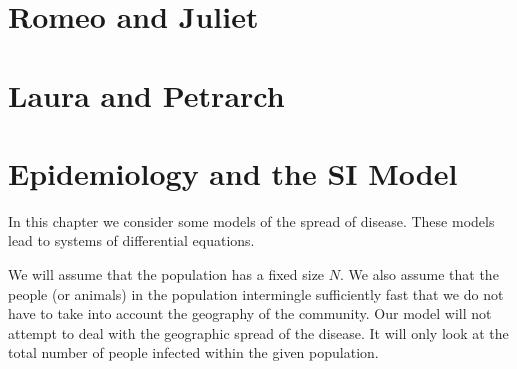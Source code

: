 \documentclass[reqno]{immbook}
\begin{document}
\section{Romeo and Juliet}
\section{Laura and Petrarch}
%
\section{Epidemiology and the SI Model}

In this chapter we consider some models of the spread of disease.
These models lead to systems of differential equations.

We will assume that the population has a fixed size $N$.
We also assume that the people (or animals) in the population
intermingle sufficiently fast that we do not have to take
into account the geography of the community.
Our model will not attempt to deal with the geographic spread
of the disease. It will only look at the total number of
people infected within the given population.
\end{document}
